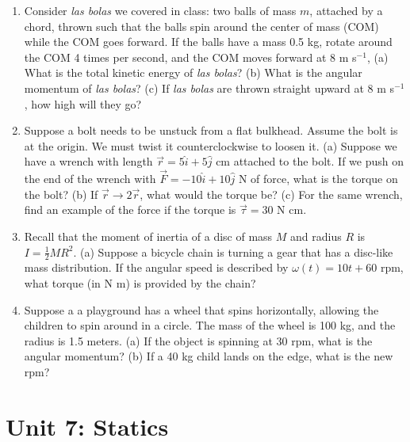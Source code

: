 \documentclass[10pt]{article}
\begin{document}
\begin{enumerate}
\item Consider \textit{las bolas} we covered in class: two balls of mass $m$, attached by a chord, thrown such that the balls spin around the center of mass (COM) while the COM goes forward.  If the balls have a mass 0.5 kg, rotate around the COM 4 times per second, and the COM moves forward at 8 m s$^{-1}$, (a) What is the total kinetic energy of \textit{las bolas}? (b) What is the angular momentum of \textit{las bolas}? (c) If \textit{las bolas} are thrown straight upward at 8 m s$^{-1}$, how high will they go? \\ \vspace{4cm}
\item  Suppose a bolt needs to be unstuck from a flat bulkhead. Assume the bolt is at the origin. We must twist it counterclockwise to loosen it. (a) Suppose we have a wrench with length $\vec{r} = 5\hat{i} + 5\hat{j}$ cm attached to the bolt. If we push on the end of the wrench with
$\vec{F} = -10\hat{i} + 10\hat{j}$ N of force, what is the torque on the bolt? (b)  If $\vec{r} \rightarrow 2\vec{r}$, what would the torque be? (c) For the same wrench, find an example of the force if the torque is $\vec{\tau} = 30$ N cm. \\ \vspace{3cm}
\item Recall that the moment of inertia of a disc of mass $M$ and radius $R$ is $I = \frac{1}{2} MR^2$. (a) Suppose a bicycle chain is turning a gear that has a disc-like mass distribution.  If the angular speed is described by $\omega(t) = 10t + 60$ rpm, what torque (in N m) is provided by the chain? \\ \vspace{3cm}
\item Suppose a a playground has a wheel that spins horizontally, allowing the children to spin around in a circle.  The mass of the wheel is 100 kg, and the radius is 1.5 meters.  (a) If the object is spinning at 30 rpm, what is the angular momentum? (b) If a 40 kg child lands on the edge, what is the new rpm? \\ \vspace{4cm}
\end{enumerate}

\section{Unit 7: Statics}
\end{document}
